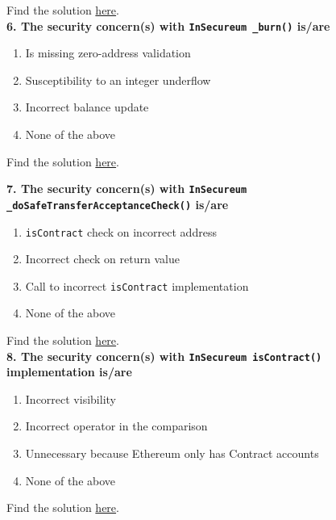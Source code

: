 Find the solution \hyperref[sec:race5_q5]{here}.\\

\textbf{6. The security concern(s) with \texttt{InSecureum \_burn()} is/are}

\begin{enumerate}[label=\Alph*.]
    \item Is missing zero-address validation
    \item Susceptibility to an integer underflow
    \item Incorrect balance update
    \item None of the above
\end{enumerate}

Find the solution \hyperref[sec:race5_q6]{here}.\\

\pagebreak

\textbf{7. The security concern(s) with \texttt{InSecureum}\\\texttt{\_doSafeTransferAcceptanceCheck()} is/are}

\begin{enumerate}[label=\Alph*.]
    \item\verb|isContract| check on incorrect address
    \item Incorrect check on return value
    \item Call to incorrect \verb|isContract| implementation
    \item None of the above
\end{enumerate}

Find the solution \hyperref[sec:race5_q7]{here}.\\

\textbf{8. The security concern(s) with \texttt{InSecureum isContract()} implementation is/are}

\begin{enumerate}[label=\Alph*.]
    \item Incorrect visibility
    \item Incorrect operator in the comparison
    \item Unnecessary because Ethereum only has Contract accounts
    \item None of the above
\end{enumerate}

Find the solution \hyperref[sec:race5_q8]{here}.\\